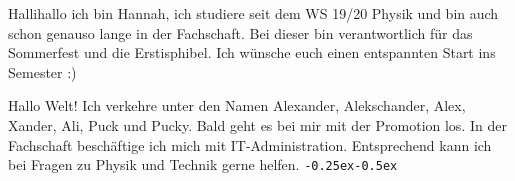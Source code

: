 \begin{multicols}{2}
{Hallihallo ich bin Hannah, ich studiere seit dem WS 19/20 Physik und bin auch schon genauso lange in der Fachschaft. 
Bei dieser bin verantwortlich für das Sommerfest und die Erstisphibel. Ich wünsche euch einen entspannten Start ins Semester :)
}


{
Hallo Welt! Ich verkehre unter den Namen Alexander, Alekschander, Alex, Xander, Ali, Puck und Pucky. Bald geht es bei mir mit der Promotion los. 
In der Fachschaft beschäftige ich mich mit IT-Administration. Entsprechend kann ich bei Fragen zu Physik und Technik gerne helfen. \texttt{\kern-0.25ex\kern-0.5ex}
}



\end{multicols}

